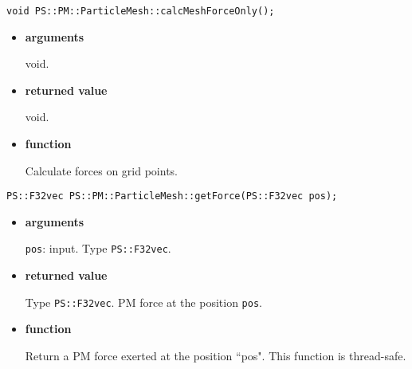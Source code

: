 
\begin{screen}
\begin{verbatim}
void PS::PM::ParticleMesh::calcMeshForceOnly();
\end{verbatim}
\end{screen}

\begin{itemize}

\item {\bf arguments}

void.

\item {\bf returned value}

void.

\item {\bf function}

Calculate forces on grid points.

\end{itemize}


\begin{screen}
\begin{verbatim}
PS::F32vec PS::PM::ParticleMesh::getForce(PS::F32vec pos);
\end{verbatim}
\end{screen}

\begin{itemize}

\item {\bf arguments}

{\tt pos}: input. Type {\tt PS::F32vec}. %


\item {\bf returned value}

Type {\tt PS::F32vec}. PM force at the position {\tt pos}.

\item {\bf function}

Return a PM force exerted at the position ``pos".
This function is thread-safe.

\end{itemize}


